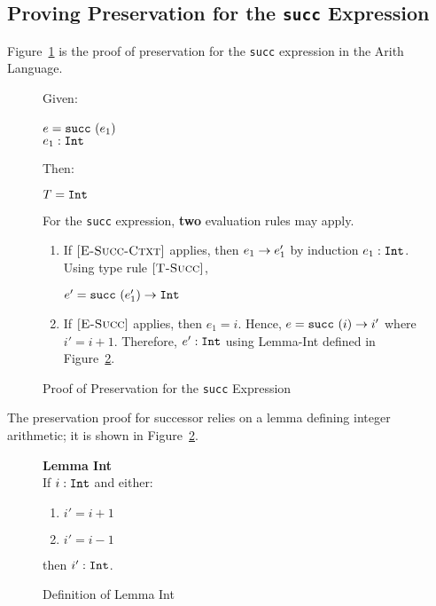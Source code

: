\documentclass{report}
\newcommand{\rel}[1]{ \mbox{\sc [#1]} }
\begin{document}
\eject
\subsection{Proving Preservation for the \texttt{succ} Expression}

Figure~\ref{fig:succProofPreservation} is the proof of preservation for the \texttt{succ} expression in the Arith Language.

\begin{figure}[ht!]
Given:
\begin{center}
   $e = \mbox{\tt succ}~(e_1)$~\\
   ${e_1} : {\mbox{\tt Int}}$
\end{center}
Then:
\begin{center}
   $T = \mbox{\tt Int}$
\end{center}
For the \texttt{succ} expression, \textbf{two} evaluation rules may apply.
\begin{enumerate}

    \item If $\rel{E-Succ-Ctxt}$ applies, then ${e_1} \rightarrow {e'_1}$ by induction ${e_1} : {\mbox{\tt Int}}$.  Using type rule $\rel{T-Succ}$,
    
    \begin{center}
      ${e' = \mbox{\tt succ}~(e'_1)} \rightarrow {\mbox{\tt Int}}$
    \end{center}
      
    \item If $\rel{E-Succ}$ applies, then $e_1 = i$.  Hence, ${e = \mbox{\tt succ}~(i)} \rightarrow {i'}$ where $i' = i + 1$.  Therefore, ${e'} : {\mbox{\tt Int}}$ using Lemma-Int defined in Figure~\ref{fig:lemmaInt}.
    
\end{enumerate}
	
  \caption{Proof of Preservation for the \texttt{succ} Expression}\label{fig:succProofPreservation}
\end{figure} 

The preservation proof for successor relies on a lemma defining integer arithmetic; it is shown in Figure~\ref{fig:lemmaInt}.

\begin{figure}[ht!]

\textbf{Lemma Int}~\\

If ${i} : {\mbox{\tt Int}}$ and either:

\begin{enumerate}

    \item $i' = i + 1$
      
    \item $i' = i - 1$
    
\end{enumerate}

then ${i'} : {\mbox{\tt Int}}$.
	
  \caption{Definition of Lemma Int}\label{fig:lemmaInt}
\end{figure} 
\end{document}
